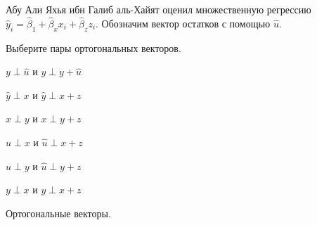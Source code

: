 
\begin{question}
Абу Али Яхья ибн Галиб аль-Хайят оценил множественную регрессию \(\hat y_i = \hat\beta_1 + \hat\beta_x x_i + \hat\beta_z z_i\).
Обозначим вектор остатков с помощью \(\hat u\).

Выберите пары ортогональных векторов.
\begin{answerlist}
  \item \(y \perp \hat u\) и \(y \perp y + \hat u\)
  \item \(\hat y \perp x\) и \(\hat y \perp x + z\)
  \item \(x \perp y\) и \(x \perp y + z\)
  \item \(\hat u \perp x\) и \(\hat u \perp x + z\)
  \item \(\hat u \perp y\) и \(\hat u \perp y + z\)
  \item \(y \perp x\) и \(y \perp x + z\)
\end{answerlist}
\end{question}

\begin{solution}
Ортогональные векторы.
\end{solution}

